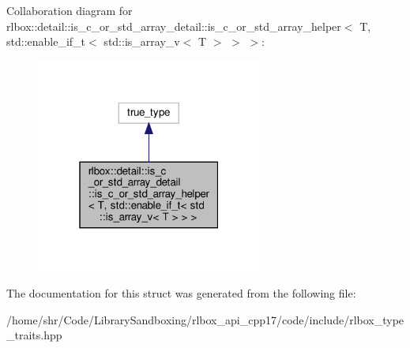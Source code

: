 Collaboration diagram for rlbox\+:\+:detail\+:\+:is\+\_\+c\+\_\+or\+\_\+std\+\_\+array\+\_\+detail\+:\+:is\+\_\+c\+\_\+or\+\_\+std\+\_\+array\+\_\+helper$<$ T, std\+:\+:enable\+\_\+if\+\_\+t$<$ std\+:\+:is\+\_\+array\+\_\+v$<$ T $>$ $>$ $>$\+:
\nopagebreak
\begin{figure}[H]
\begin{center}
\leavevmode
\includegraphics[width=211pt]{structrlbox_1_1detail_1_1is__c__or__std__array__detail_1_1is__c__or__std__array__helper_3_01T_00e165179d6402fff81dafd61404964f06}
\end{center}
\end{figure}


The documentation for this struct was generated from the following file\+:\begin{DoxyCompactItemize}
\item 
/home/shr/\+Code/\+Library\+Sandboxing/rlbox\+\_\+api\+\_\+cpp17/code/include/rlbox\+\_\+type\+\_\+traits.\+hpp\end{DoxyCompactItemize}
